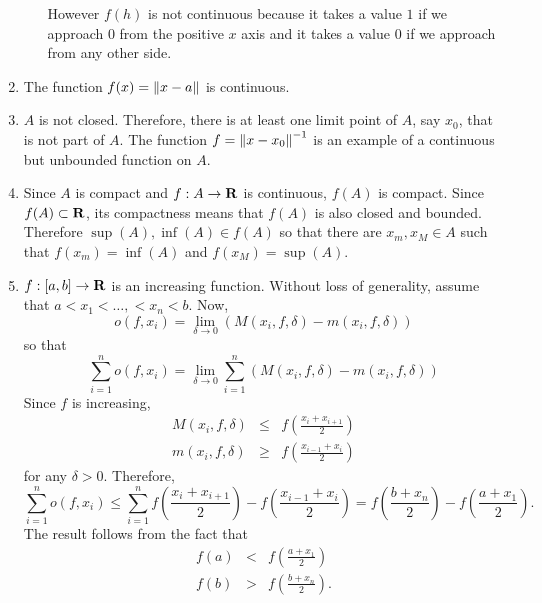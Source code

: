 \begin{enumerate}
\begin{enumerate}
However $f(h)$ is not continuous because it takes a value $1$ if we approach
$0$ from the positive $x$ axis and it takes a value $0$ if we approach from
any other side.
\end{enumerate}

\item The function $f(x) = \left\Vert{x - a}\right\Vert$ is continuous.

\item $A$ is not closed. Therefore, there is at least one limit point of $A$,
say $x_0$, that is not part of $A$. The function $f = \left\Vert{x - x_0}\right\Vert^{-1}$ is
an example of a continuous but unbounded function on $A$.

\item Since $A$ is compact and $f: A \rightarrow \mathbf{R}$ is continuous, $f(A)$
is compact. Since $f(A) \subset \mathbf{R}$, its compactness means that $f(A)$ is 
also closed and bounded. Therefore $\sup(A), \inf(A) \in f(A)$ so that
there are $x_m, x_M \in A$ such that $f(x_m) = \inf(A)$ and $f(x_M) = \sup(A)$.

\item $f:[a, b] \rightarrow \mathbf{R}$ is an increasing function. Without loss of
generality, assume that $a < x_1 < \ldots, < x_n < b$. Now, 
\[
o(f, x_i) = \lim_{\delta \rightarrow 0}(M(x_i, f, \delta) - m(x_i, f, \delta))
\]
so that
\[
\sum_{i=1}^n o(f, x_i) = \lim_{\delta \rightarrow 0} \sum_{i=1}^n
(M(x_i, f, \delta) - m(x_i, f, \delta))
\]
Since $f$ is increasing,
\begin{eqnarray*}
M(x_i, f, \delta) &\le& f\left(\frac{x_i + x_{i+1}}{2}\right) \\
m(x_i, f, \delta) &\ge& f\left(\frac{x_{i-1} + x_i}{2}\right) 
\end{eqnarray*}
for any $\delta > 0$. Therefore, 
\[
\sum_{i=1}^n o(f, x_i) \le \sum_{i=1}^n f\left(\frac{x_i + x_{i+1}}{2}\right) -
f\left(\frac{x_{i-1} + x_i}{2}\right) = f\left(\frac{b + x_n}{2}\right) - 
f\left(\frac{a + x_1}{2}\right).
\]
The result follows from the fact that 
\begin{eqnarray*}
f(a) &<& f\left(\frac{a + x_1}{2}\right) \\
f(b) &>& f\left(\frac{b + x_n}{2}\right).
\end{eqnarray*}

\end{enumerate}



